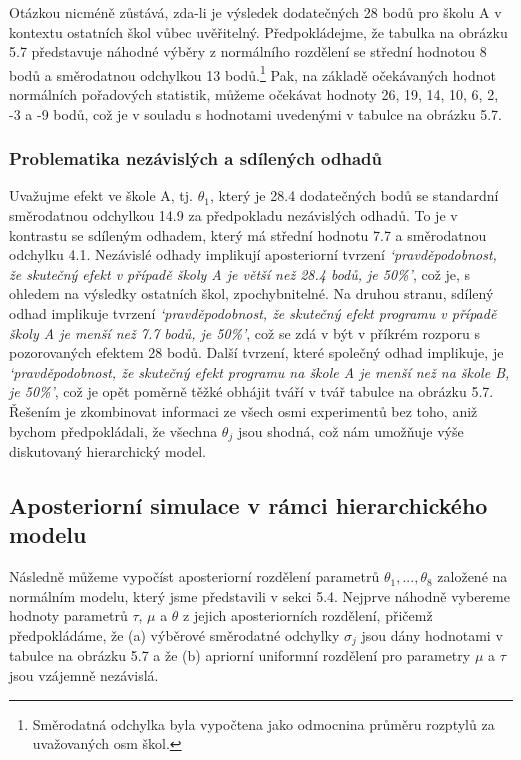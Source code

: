 Otázkou nicméně zůstává, zda-li je výsledek dodatečných 28 bodů pro školu A v kontextu ostatních škol vůbec uvěřitelný. Předpokládejme, že tabulka na obrázku 5.7 představuje náhodné výběry z normálního rozdělení se střední hodnotou 8 bodů a směrodatnou odchylkou 13 bodů.\footnote{Směrodatná odchylka byla vypočtena jako odmocnina průměru rozptylů za uvažovaných osm škol.} Pak, na základě očekávaných hodnot normálních pořadových statistik, můžeme očekávat hodnoty 26, 19, 14, 10, 6, 2, -3 a -9 bodů, což je v souladu s hodnotami uvedenými v tabulce na obrázku 5.7.

\subsubsection{Problematika nezávislých a sdílených odhadů}

Uvažujme efekt ve škole A, tj. $\theta_1$, který je 28.4 dodatečných bodů se standardní směrodatnou odchylkou 14.9 za předpokladu nezávislých odhadů. To je v kontrastu se sdíleným odhadem, který má střední hodnotu 7.7 a směrodatnou odchylku 4.1. Nezávislé odhady implikují aposteriorní tvrzení \textit{`pravděpodobnost, že skutečný efekt v případě školy A je větší než 28.4 bodů, je 50\%'}, což je, s ohledem na výsledky ostatních škol, zpochybnitelné. Na druhou stranu, sdílený odhad implikuje tvrzení \textit{`pravděpodobnost, že skutečný efekt programu v případě školy A je menší než 7.7 bodů, je 50\%'}, což se zdá v být v příkrém rozporu s pozorovaných efektem 28 bodů. Další tvrzení, které společný odhad implikuje, je \textit{`pravděpodobnost, že skutečný efekt programu na škole A je menší než na škole B, je 50\%'}, což je opět poměrně těžké obhájit tváří v tvář tabulce na obrázku 5.7. Řešením je zkombinovat informaci ze všech osmi experimentů bez toho, aniž bychom předpokládali, že všechna $\theta_j$ jsou shodná, což nám umožňuje výše diskutovaný hierarchický model.

\subsection{Aposteriorní simulace v rámci hierarchického modelu}

Následně můžeme vypočíst aposteriorní rozdělení parametrů $\theta_1, ..., \theta_8$ založené na normálním modelu, který jsme představili v sekci 5.4. Nejprve náhodně vybereme hodnoty parametrů $\tau$, $\mu$ a $\theta$ z jejich aposteriorních rozdělení, přičemž předpokládáme, že (a) výběrové směrodatné odchylky $\sigma_j$ jsou dány hodnotami v tabulce na obrázku 5.7 a že (b) apriorní uniformní rozdělení pro parametry $\mu$ a $\tau$ jsou vzájemně nezávislá.

